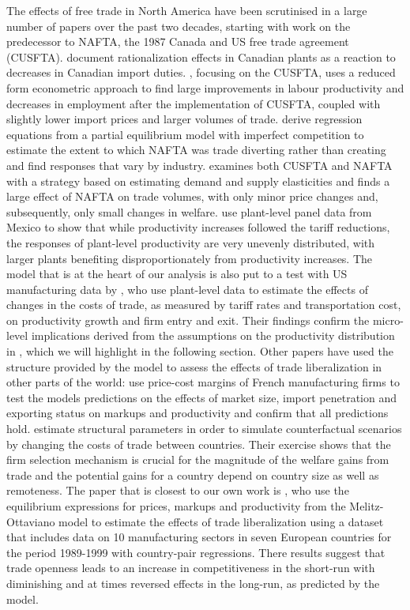 The effects of free trade in North America have been scrutinised in a large number of papers over the past two decades, starting with work on the predecessor to NAFTA, the 1987 Canada and US free trade agreement (CUSFTA). \citet{Head1999} document rationalization effects in Canadian plants as a reaction to decreases in Canadian import duties. \citet{Trefler2004}, focusing on the CUSFTA, uses a reduced form econometric approach to find large improvements in labour productivity and decreases in employment after the implementation of CUSFTA, coupled with slightly lower import prices and larger volumes of trade. \citet*{Fukao2003} derive regression equations from a partial equilibrium model with imperfect competition to estimate the extent to which NAFTA was trade diverting rather than creating and find responses that vary by industry. \citet{Romalis2007} examines both CUSFTA and NAFTA with a strategy based on estimating demand and supply elasticities and finds a large effect of NAFTA on trade volumes, with only minor price changes and, subsequently, only small changes in welfare. \citet{Calderon-Madrid2007} use plant-level panel data from Mexico to show that while productivity increases followed the tariff reductions, the responses of plant-level productivity are very unevenly distributed, with larger plants benefiting disproportionately from productivity increases. The \citet{Melitz2003} model that is at the heart of our analysis is also put to a test with US manufacturing data by \citet*{Bernard2006a}, who use plant-level data to estimate the effects of changes in the costs of trade, as measured by tariff rates and transportation cost, on productivity growth and firm entry and exit. Their findings confirm the micro-level implications derived from the assumptions on the productivity distribution in \citet{Melitz2003}, which we will highlight in the following section. Other papers have used the structure provided by the \citet{MelitzOttaviano2008} model to assess the effects of trade liberalization in other parts of the world: \citet{Bellone2008} use price-cost margins of French manufacturing firms to test the models predictions on the effects of market size, import penetration and exporting status on markups and productivity and confirm that all predictions hold. \citet{Corcos2011} estimate structural parameters in order to simulate counterfactual scenarios by changing the costs of trade between countries. Their exercise shows that the firm selection mechanism is crucial for the magnitude of the welfare gains from trade and the potential gains for a country depend on country size as well as remoteness. The paper that is closest to our own work is \citet{Chen2009}, who use the equilibrium expressions for prices, markups and productivity from the Melitz-Ottaviano model to estimate the effects of trade liberalization using a dataset that includes data on 10 manufacturing sectors in seven European countries for the period 1989-1999 with country-pair regressions. There results suggest that trade openness leads to an increase in competitiveness in the short-run with diminishing and at times reversed effects in the long-run, as predicted by the model. 

